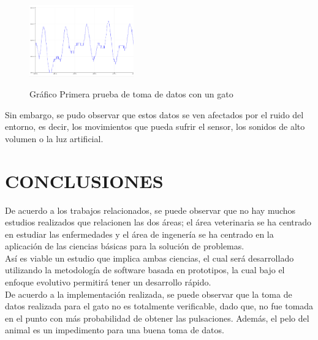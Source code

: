 \documentclass[letterpaper, 10 pt, conference]{ieeeconf}  %
\begin{document}
\begin{figure}
\centering
\includegraphics[width=0.4\textwidth]{catData.png}
\label{fig:cat1Data}
\caption{Gr\'afico Primera prueba de toma de datos con un gato}
\end{figure}

Sin embargo, se pudo observar que estos datos se ven afectados por el ruido del entorno, es decir, los movimientos que pueda sufrir el sensor, los sonidos de alto volumen o la luz artificial.\\

\section{CONCLUSIONES}

De acuerdo a los trabajos relacionados, se puede observar que no hay muchos estudios realizados que relacionen las dos \'areas; el \'area veterinaria se ha centrado en estudiar las enfermedades y el \'area de ingener\'ia se ha centrado en la aplicaci\'on de las ciencias b\'asicas para la soluci\'on de problemas.\\

As\'i es viable un estudio que implica ambas ciencias, el cual ser\'a desarrollado utilizando la metodolog\'ia de software basada en prototipos, la cual bajo el enfoque evolutivo permitir\'a tener un desarrollo r\'apido.\\

De acuerdo a la implementaci\'on realizada, se puede observar que la toma de datos realizada para el gato no es totalmente verificable, dado que, no fue tomada en el punto con m\'as probabilidad de obtener las pulsaciones. Adem\'as, el pelo del animal es un impedimento para una buena toma de datos.

\addtolength{\textheight}{-12cm}   %
\end{document}
